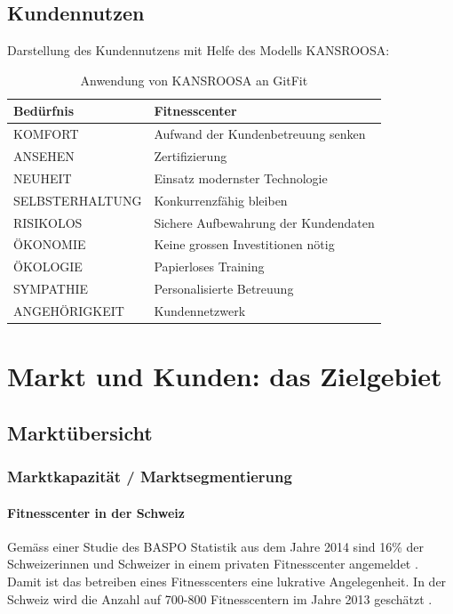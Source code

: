 \subsection{Kundennutzen}
Darstellung des Kundennutzens mit Helfe des Modells KANSROOSA:
\begin{table}[H]
	\centering
	\begin{tabu} to \linewidth {l l}
		\toprule 
		Bedürfnis & Fitnesscenter \\
		\midrule
		KOMFORT & Aufwand der Kundenbetreuung senken \\
		ANSEHEN & Zertifizierung \\
		NEUHEIT & Einsatz modernster Technologie \\
		SELBSTERHALTUNG & Konkurrenzfähig bleiben \\
		RISIKOLOS & Sichere Aufbewahrung der Kundendaten \\
		ÖKONOMIE & Keine grossen Investitionen nötig \\
		ÖKOLOGIE & Papierloses Training \\
		SYMPATHIE & Personalisierte Betreuung \\
		ANGEHÖRIGKEIT & Kundennetzwerk \\
		\bottomrule 
	\end{tabu} 
	\caption{Anwendung von KANSROOSA an GitFit}
\end{table}


\clearpage
\section{Markt und Kunden: das Zielgebiet}

\subsection{Marktübersicht}

\subsubsection{Marktkapazität / Marktsegmentierung}\label{sec:marktkapazitat}

\paragraph{Fitnesscenter in der Schweiz}
Gemäss einer Studie des BASPO Statistik aus dem Jahre 2014 sind 16\% der Schweizerinnen und Schweizer in einem privaten Fitnesscenter angemeldet \cite{schweizer+fitness}. Damit ist das betreiben eines Fitnesscenters eine lukrative Angelegenheit. In der Schweiz wird die Anzahl auf 700-800 Fitnesscentern im Jahre 2013 geschätzt \cite{fitness-studios+1+milliarde}\cite{fitness+tribune}.

